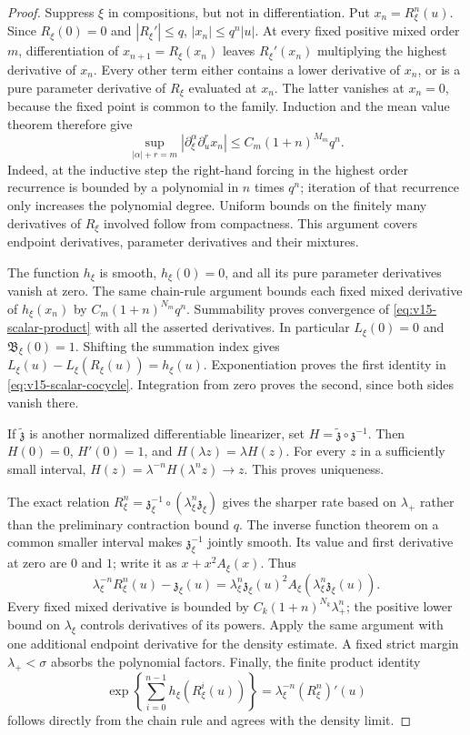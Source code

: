 \begin{proof}
Suppress $\xi$ in compositions, but not in differentiation. Put
$x_n=R_\xi^n(u)$. Since $R_\xi(0)=0$ and $|R_\xi'|\le q$,
$|x_n|\le q^n|u|$. At every fixed positive mixed order $m$,
differentiation of $x_{n+1}=R_\xi(x_n)$ leaves
$R_\xi'(x_n)$ multiplying the highest derivative of $x_n$.
Every other term either contains a lower derivative of $x_n$, or
is a pure parameter derivative of $R_\xi$ evaluated at $x_n$.
The latter vanishes at $x_n=0$, because the fixed point is common to
the family. Induction and the mean value theorem therefore give
\[
 \sup_{|\alpha|+r=m}|\partial_\xi^\alpha\partial_u^r x_n|
                  \le C_m(1+n)^{M_m}q^n.
\]
Indeed, at the inductive step the right-hand forcing in the highest
order recurrence is bounded by a polynomial in $n$ times $q^n$;
iteration of that recurrence only increases the polynomial degree.
Uniform bounds on the finitely many derivatives of $R_\xi$ involved
follow from compactness. This argument covers endpoint derivatives,
parameter derivatives and their mixtures.

The function $h_\xi$ is smooth, $h_\xi(0)=0$, and all its pure
parameter derivatives vanish at zero. The same chain-rule argument
bounds each fixed mixed derivative of $h_\xi(x_n)$ by
$C_m(1+n)^{N_m}q^n$. Summability proves convergence of
\eqref{eq:v15-scalar-product} with all the asserted derivatives.
In particular $L_\xi(0)=0$ and $\mathfrak B_\xi(0)=1$.
Shifting the summation index gives
$L_\xi(u)-L_\xi(R_\xi(u))=h_\xi(u)$. Exponentiation proves the
first identity in \eqref{eq:v15-scalar-cocycle}. Integration from
zero proves the second, since both sides vanish there.

If $\widetilde{\mathfrak z}$ is another normalized differentiable
linearizer, set $H=\widetilde{\mathfrak z}\circ\mathfrak z^{-1}$.
Then $H(0)=0$, $H'(0)=1$, and $H(\lambda z)=\lambda H(z)$.
For every $z$ in a sufficiently small interval,
$H(z)=\lambda^{-n}H(\lambda^nz)\to z$. This proves uniqueness.

The exact relation
$R_\xi^n=\mathfrak z_\xi^{-1}\circ(\lambda_\xi^n\mathfrak z_\xi)$
gives the sharper rate based on $\lambda_+$ rather than the
preliminary contraction bound $q$. The inverse function theorem on
a common smaller interval makes $\mathfrak z_\xi^{-1}$ jointly
smooth. Its value and first derivative at zero are $0$ and $1$;
write it as $x+x^2A_\xi(x)$. Thus
\[
 \lambda_\xi^{-n}R_\xi^n(u)-\mathfrak z_\xi(u)
 =\lambda_\xi^n\mathfrak z_\xi(u)^2
      A_\xi(\lambda_\xi^n\mathfrak z_\xi(u)).
\]
Every fixed mixed derivative is bounded by
$C_k(1+n)^{N_k}\lambda_+^n$; the positive lower bound on
$\lambda_\xi$ controls derivatives of its powers. Apply the same
argument with one additional endpoint derivative for the density
estimate. A fixed strict margin $\lambda_+<\sigma$ absorbs the
polynomial factors. Finally, the finite product identity
\begin{equation}\label{eq:v15-finite-product}
 \exp\!\left\{\sum_{i=0}^{n-1}h_\xi(R_\xi^i(u))\right\}
                   =\lambda_\xi^{-n}(R_\xi^n)'(u)
\end{equation}
follows directly from the chain rule and agrees with the density limit.
\end{proof}


